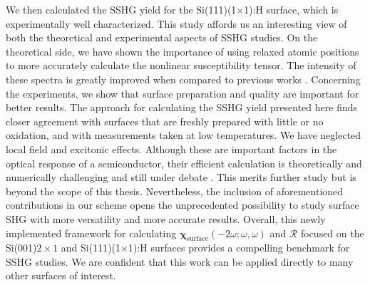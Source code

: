 We then calculated the SSHG yield for the Si(111)(1$\times$1):H surface, which is
experimentally well characterized. This study affords us an interesting view of
both the theoretical and experimental aspects of SSHG studies. On the
theoretical side, we have shown the importance of using relaxed atomic positions
to more accurately calculate the nonlinear susceptibility tensor. The intensity
of these spectra is greatly improved when compared to previous works
\cite{mejiaPRB02}. Concerning the experiments, we show that surface preparation
and quality are important for better results. The approach for calculating the
SSHG yield presented here finds closer agreement with surfaces that are freshly
prepared with little or no oxidation, and with measurements taken at low
temperatures. We have neglected local field and excitonic effects. Although
these are important factors in the optical response of a semiconductor, their
efficient calculation is theoretically and numerically challenging and still
under debate \cite{beyond}. This merits further study but is beyond the scope of
this thesis. Nevertheless, the inclusion of aforementioned contributions in our
scheme opens the unprecedented possibility to study surface SHG with more
versatility and more accurate results. Overall, this newly implemented framework
for calculating $\boldsymbol{\chi}_{\mathrm{surface}}(-2\omega;\omega,\omega)$
and $\mathcal{R}$ focused on the Si(001)$2\times 1$ and Si(111)(1$\times$1):H
surfaces provides a compelling benchmark for SSHG studies. We are confident that
this work can be applied directly to many other surfaces of interest.

\stopcontents[chapters]
